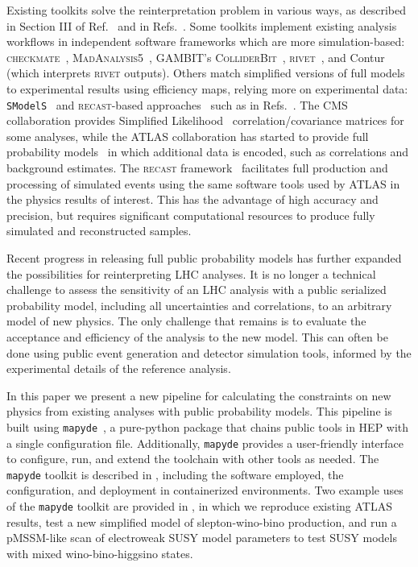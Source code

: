 \documentclass{article}
\newcommand{\mapyde}{\texttt{mapyde}}
\newcommand{\recast}{\textsc{recast}}
\begin{document}
Existing toolkits solve the reinterpretation problem in various ways, as described in Section III of Ref.~\cite{LHCReinterpretationForum:2020xtr} and in Refs.~\cite{Cranmer:2021urp,Bailey:2022tdz}.  Some toolkits implement existing analysis workflows in independent software frameworks which are more simulation-based: \textsc{checkmate}~\cite{Dercks:2016npn}, \textsc{MadAnalysis5}~\cite{Conte:2018vmg,Araz:2020lnp,Dumont:2014tja}, \textsc{GAMBIT}'s \textsc{ColliderBit}~\cite{GAMBIT:2017yxo,Kvellestad:2019vxm,GAMBIT:2018gjo,zenodo:gambit}, \textsc{rivet}~\cite{Bierlich:2019rhm,Bierlich:2020wms}, and Contur~\cite{Buckley:2021neu} (which interprets \textsc{rivet} outputs).  Others match simplified versions of full models to experimental results using efficiency maps, relying more on experimental data: \texttt{SModelS}~\cite{Alguero:2021dig} and \recast-based approaches~\cite{Cranmer:2010hk} such as in Refs.~\cite{zenodo:LHCreinterpretation,llpRepo,RECAST1,RECAST2,RECAST3}.  The CMS collaboration provides Simplified Likelihood~\cite{CMS-NOTE-2017-001} correlation/covariance matrices for some analyses, while the ATLAS collaboration has started to provide full probability models~\cite{ATL-PHYS-PUB-2019-029} in which additional data is encoded, such as correlations and background estimates. The \recast{} framework~\cite{Cranmer:2010hk} facilitates full production and processing of simulated events using the same software tools used by ATLAS in the physics results of interest.  This has the advantage of high accuracy and precision, but requires significant computational resources to produce fully simulated and reconstructed samples.

Recent progress in releasing full public probability models has further expanded the possibilities for reinterpreting LHC analyses.  It is no longer a technical challenge to assess the sensitivity of an LHC analysis with a public serialized probability model, including all uncertainties and correlations, to an arbitrary model of new physics.  The only challenge that remains is to evaluate the acceptance and efficiency of the analysis to the new model.  This can often be done using public event generation and detector simulation tools, informed by the experimental details of the reference analysis.

In this paper we present a new pipeline for calculating the constraints on new physics from existing analyses with public probability models. This pipeline is built using \mapyde~\cite{mapyde}, a pure-python package that chains public tools in HEP with a single configuration file. Additionally, \mapyde{} provides a user-friendly interface to configure, run, and extend the toolchain with other tools as needed.  The \mapyde{} toolkit is described in , including the software employed, the configuration, and deployment in containerized environments.  Two example uses of the \mapyde{} toolkit are provided in , in which we reproduce existing ATLAS results, test a new simplified model of slepton-wino-bino production, and run a pMSSM-like scan of electroweak SUSY model parameters to test SUSY models with mixed wino-bino-higgsino states.
\end{document}
